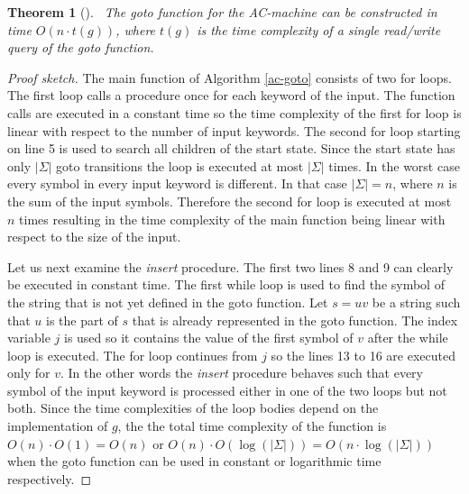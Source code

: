\documentclass[english,twoside,censored,csm,algorithms-track-2020]{HYthesisML}
\theoremstyle{plain}
\newtheorem{theorem}{Theorem}[chapter]
\theoremstyle{definition}
\begin{document}
\begin{theorem}[]~\label{thm-time-goto}
  The goto function for the AC-machine can be constructed in time $O(n \cdot t(g))$,
  where $t(g)$ is the time complexity of a single read/write query of the
  goto function.
\end{theorem}
\begin{proof}[Proof sketch]
The main function of Algorithm \ref{ac-goto} consists of two for loops.
The first loop calls a procedure once for each keyword of the input. The function calls are
executed in a constant time so the time complexity of the first for loop is linear with respect
to the number of input keywords. The second for loop starting on line 5 is used to search all
children of the start state. Since the start state has only $|\Sigma|$ goto transitions the loop
is executed at most $|\Sigma|$ times. In the worst case every symbol
in every input keyword is different. In that case $|\Sigma| = n$, where $n$ is the sum of the input
symbols. Therefore the second for loop is executed at most $n$ times resulting in the time complexity of
the main function being linear with respect to the size of the input.

Let us next examine the \textit{insert} procedure. The first two lines 8 and 9 can clearly be executed in
constant time. The first while loop is used to find the symbol of the string that is not yet defined
in the goto function. Let $s=uv$ be a string such that $u$ is the part of $s$ that is already represented in the
goto function. The index variable $j$ is used so it contains the value of the first symbol of $v$ after
the while loop is executed. The for loop continues from $j$ so the lines 13 to 16 are executed
only for $v$. In the other words the \textit{insert} procedure behaves such that every symbol of
the input keyword is processed either in one of the two loops but not both. Since the time complexities
of the loop bodies depend on the implementation of $g$, the the total time complexity of the function
is $O(n)\cdot O(1) = O(n)$ or $O(n)\cdot O(\log(|\Sigma|)) = O(n\cdot\log(|\Sigma|))$ when the
goto function can be used in constant or logarithmic time respectively.

\end{proof}
\end{document}
